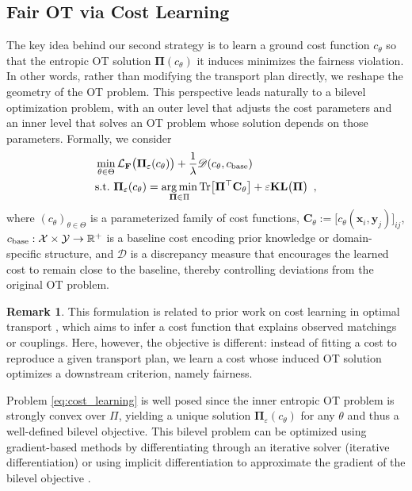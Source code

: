\documentclass{article}
\DeclareMathOperator*{\argmin}{arg\,min}
\newcommand{\kl}{\mathbf{KL}}
\theoremstyle{definition}
\newtheorem{remark}[theorem]{Remark}
\begin{document}
\subsection{Fair OT via Cost Learning}
The key idea behind our second strategy is to learn a ground cost function $c_\theta$ so that the entropic OT solution $\mathbf{\Pi}(c_\theta)$ it induces minimizes the fairness violation. In other words, rather than modifying the transport plan directly, we reshape the geometry of the OT problem.
This perspective leads naturally to a bilevel optimization problem, with an outer level that adjusts the cost parameters and an inner level that solves an OT problem whose solution depends on those parameters.
Formally, we consider
\begin{align}\label{eq:cost_learning} 
    \begin{aligned}
    &\min\limits_{\theta \in \Theta} \mathcal{L}_\mathbf{F}\big(\mathbf{\Pi}_\varepsilon(c_\theta)\big) + \frac{1}{\lambda} \mathscr{D}(c_\theta,c_\textnormal{base}) \\
    &\textnormal{s.t.} \,\, \mathbf{\Pi}_\varepsilon(c_\theta) = \argmin\limits_{\mathbf{\Pi}\in \Pi} \textnormal{Tr}\big[\mathbf{\Pi}^\top \mathbf{C}_\theta\big] + \varepsilon\kl\big(\mathbf{\Pi}\big)\enspace,
    \end{aligned}
\end{align}
where $(c_\theta)_{\theta\in\Theta}$ is a parameterized family of cost functions, $\mathbf{C}_\theta := \big[c_\theta(\mathbf{x}_i,\mathbf{y}_j)\big]_{ij}$, $c_\textnormal{base}:\mathcal{X}\times \mathcal{Y} \to \mathbb{R}^+$ is a baseline cost encoding prior knowledge or domain-specific structure, and $\mathscr{D}$ is a discrepancy measure that encourages the learned cost to remain close to the baseline, thereby controlling deviations from the original OT problem.
\begin{remark}
    This formulation is related to prior work on cost learning in optimal transport \cite{JMLR:v20:18-700,andrade2023sparsistency}, which aims to infer a cost function that explains observed matchings or couplings. Here, however, the objective is different: instead of fitting a cost to reproduce a given transport plan, we learn a cost whose induced OT solution optimizes a downstream criterion, namely fairness.
\end{remark}
Problem \eqref{eq:cost_learning} is well posed since the inner entropic OT problem is strongly convex over $\Pi$, yielding a unique solution $\mathbf{\Pi}_\varepsilon(c_\theta)$ for any $\theta$ and thus a well-defined bilevel objective.
This bilevel problem can be optimized using gradient-based methods by differentiating through an iterative solver (iterative differentiation) \citep{Bolte2023one_step_diff,Franceschi2017ForwardReverse,Maclaurin2015,Pauwels2023} or using implicit differentiation to approximate the gradient of the bilevel objective \citep{Dagreou2022SABA,Dagreou2024SRBA,Eisenberger2022,Ghadimi2018}. 
\end{document}
